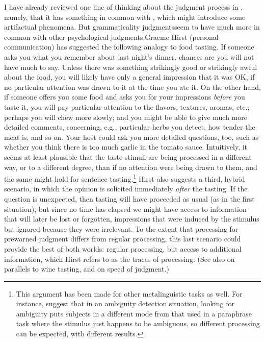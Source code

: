 I have already reviewed one line of thinking about the judgment process in , namely, that it has something in common with , which might introduce some artifactual phenomena. But grammaticality judgments\linebreak seem to have much more in common with other psychological judgments.\linebreak Graeme Hirst (personal communication) has suggested the following analogy to food tasting. If someone asks you what you remember about last night's dinner, chances are you will not have much to say. Unless there was something strikingly good or strikingly awful about the food, you will likely have only a general impression that it was OK, if no particular attention was drawn to it at the time you ate it. On the other hand, if someone offers you some food and asks you for your impressions \textit{before} you taste it, you will pay particular attention to the flavors, textures, aromas, etc.; perhaps you will chew more slowly; and you might be able to give much more detailed comments, concerning, e.g., particular herbs you detect, how
tender the meat is, and so on. Your host could ask you more detailed questions, too, such as whether you think there is too much garlic in the tomato sauce. Intuitively, it seems at least plausible that the taste stimuli are being processed in a different way, or to a different degree, than if no attention were being drawn to them, and the same might hold for sentence tasting.\footnote{ This argument has been made for other metalinguistic tasks as well. For instance, \citet{KessEtAl1983} suggest that in an ambiguity detection situation, looking for ambiguity puts subjects in a different mode from that used in a paraphrase task where the stimulus just happens to be ambiguous, so different processing can be expected, with different results.}
 Hirst also suggests a third, hybrid scenario, in which the opinion is solicited immediately \textit{after} the tasting. If the question is unexpected, then tasting will have proceeded as usual (as in the first situation), but since no time has elapsed we might have access to information that will later be lost or forgotten, impressions that were induced by the stimulus but ignored because they were irrelevant. To the extent that processing for prewarned judgment differs from regular processing, this last scenario could provide the best of both worlds: regular processing, but access to additional information, which Hirst refers to as the traces of processing. (See also  on parallels to wine tasting, and  on speed of judgment.)

